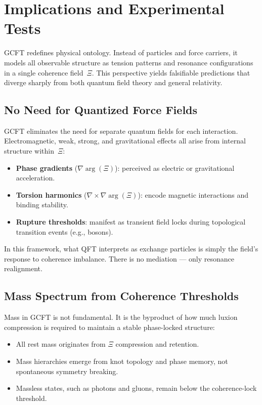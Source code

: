 \section{Implications and Experimental Tests}

GCFT redefines physical ontology. Instead of particles and force carriers, it models all observable structure as tension patterns and resonance configurations in a single coherence field~$\Xi$. This perspective yields falsifiable predictions that diverge sharply from both quantum field theory and general relativity.

\subsection{No Need for Quantized Force Fields}

GCFT eliminates the need for separate quantum fields for each interaction. Electromagnetic, weak, strong, and gravitational effects all arise from internal structure within~$\Xi$:

\begin{itemize}
  \item \textbf{Phase gradients} ($\nabla \arg(\Xi)$): perceived as electric or gravitational acceleration.
  \item \textbf{Torsion harmonics} ($\nabla \times \nabla \arg(\Xi)$): encode magnetic interactions and binding stability.
  \item \textbf{Rupture thresholds}: manifest as transient field locks during topological transition events (e.g., bosons).
\end{itemize}

In this framework, what QFT interprets as exchange particles is simply the field’s response to coherence imbalance. There is no mediation — only resonance realignment.

\subsection{Mass Spectrum from Coherence Thresholds}

Mass in GCFT is not fundamental. It is the byproduct of how much luxion compression is required to maintain a stable phase-locked structure:

\begin{itemize}
  \item All rest mass originates from $\Xi$ compression and retention.
  \item Mass hierarchies emerge from knot topology and phase memory, not spontaneous symmetry breaking.
  \item Massless states, such as photons and gluons, remain below the coherence-lock threshold.
\end{itemize}

